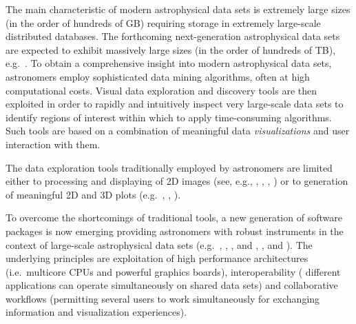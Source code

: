 \documentclass[1p,times]{elsarticle}
\begin{document}
The main characteristic of modern astrophysical data sets is extremely large
sizes (in the order of hundreds of GB) requiring storage in extremely
large-scale distributed databases. The forthcoming next-generation astrophysical 
data sets are expected to exhibit massively large sizes (in the order of hundreds
of TB), e.g.\ \cite{lsst}.
To obtain a comprehensive insight into modern astrophysical data sets, astronomers
employ sophisticated data mining algorithms, often at high computational costs. 
Visual data exploration and discovery tools are then exploited in order to rapidly 
and intuitively inspect very large-scale data sets to identify regions of interest
within which to apply time-consuming algorithms. Such tools are based on a 
combination of meaningful data {\it visualizations} and user interaction with them.  


The data exploration tools traditionally employed by astronomers 
are limited either 
to processing and displaying of 2D images (see, e.g., \cite{iraf},
\cite{midas}, \cite{sao},
\cite{gaia}) or to
generation of meaningful 2D and 3D plots (e.g.\ \cite{gnuplot},
\cite{supermongo}, \cite{idl}).
 

To overcome the shortcomings of traditional tools, a new generation of software 
packages is now emerging providing astronomers with robust instruments in the context 
of large-scale astrophysical data sets (e.g.\ \cite{paraview}, \cite{aladin},
\cite{topcat}, \cite{visivo1} and \cite{visivo2}, 
\cite{3dslicer}, \cite{splash} and \cite{visit}). 
The underlying principles are exploitation of high performance architectures 
(i.e.\ multicore CPUs and powerful graphics boards), interoperability ( 
different applications can operate simultaneously on 
shared data sets) and collaborative workflows (permitting several users to
work simultaneously for exchanging information and visualization experiences).
\end{document}
